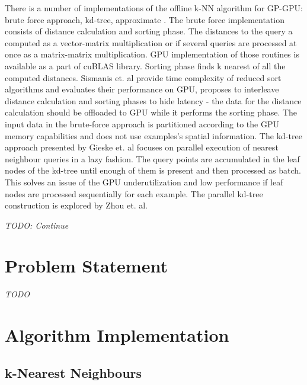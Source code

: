 \documentclass[]{report}
\begin{document}
There is a number of implementations of the offline k-NN algorithm for GP-GPU: brute force approach\cite{AliDashti}\cite{Kuang_l}\cite{Kato}\cite{Sismanis2012}, kd-tree\cite{gieseke2014buffer}\cite{Zhou}, approximate \cite{flann_pami_2014}\cite{VLSH}. 
The brute force implementation consists of distance calculation and sorting phase. The distances to the query a computed as a vector-matrix multiplication or if several queries are processed at once as a matrix-matrix multiplication. GPU implementation of those routines is available as a part of cuBLAS library\cite{cuBLAS}. Sorting phase finds k nearest of all the computed distances\cite{Sismanis2012}. Sismanis et. al\cite{Sismanis2012} provide time complexity of reduced sort algorithms and evaluates their performance on GPU, proposes to interleave distance calculation and sorting phases to hide latency - the data for the distance calculation should be offloaded to GPU while it performs the sorting phase. The input data in the brute-force approach is partitioned according to the GPU memory capabilities and does not use examples's spatial information.
The kd-tree approach presented by Gieske et. al focuses on parallel execution of nearest neighbour queries in a lazy fashion. The query points are accumulated in the leaf nodes of the kd-tree until enough of them is present and then processed as batch. This solves an issue of the GPU underutilization and low performance if leaf nodes are processed sequentially for each example\cite{gieseke2014buffer}.
The parallel kd-tree construction is explored by Zhou et. al\cite{Zhou}. 

\textit{TODO: Continue}
\section*{Problem Statement}
\textit{TODO}

\section*{Algorithm Implementation}
\subsection*{k-Nearest Neighbours}
\end{document}
